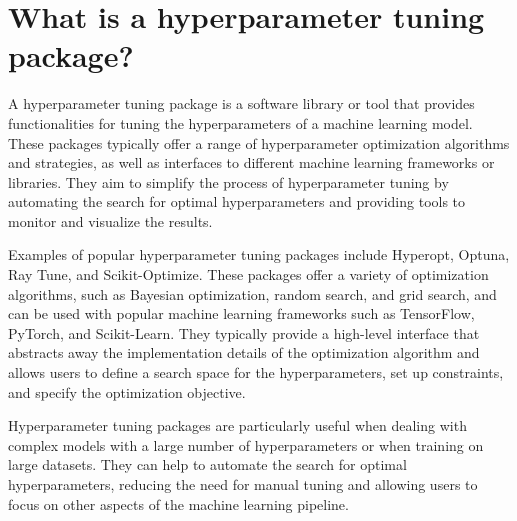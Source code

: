 \section{What is a hyperparameter tuning package?}
A hyperparameter tuning package is a software library or tool that provides functionalities for tuning the hyperparameters of a machine learning model. These packages typically offer a range of hyperparameter optimization algorithms and strategies, as well as interfaces to different machine learning frameworks or libraries. They aim to simplify the process of hyperparameter tuning by automating the search for optimal hyperparameters and providing tools to monitor and visualize the results.

Examples of popular hyperparameter tuning packages include Hyperopt, Optuna, Ray Tune, and Scikit-Optimize. These packages offer a variety of optimization algorithms, such as Bayesian optimization, random search, and grid search, and can be used with popular machine learning frameworks such as TensorFlow, PyTorch, and Scikit-Learn. They typically provide a high-level interface that abstracts away the implementation details of the optimization algorithm and allows users to define a search space for the hyperparameters, set up constraints, and specify the optimization objective.

Hyperparameter tuning packages are particularly useful when dealing with complex models with a large number of hyperparameters or when training on large datasets. They can help to automate the search for optimal hyperparameters, reducing the need for manual tuning and allowing users to focus on other aspects of the machine learning pipeline.
